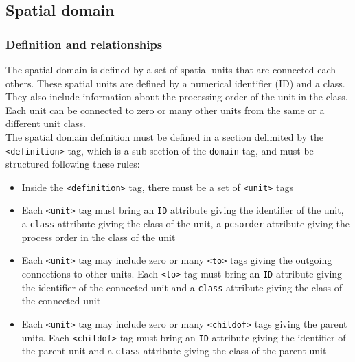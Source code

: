 


\bigskip

\subsection{Spatial domain}

\subsubsection{Definition and relationships}

The spatial domain is defined by a set of spatial units that are connected each others.
These spatial units are defined by a numerical identifier (ID) and a class.
They also include information about the processing order of the unit in the class.
Each unit can be connected to zero or many other units from the same or a different unit class.\\
\noindent The spatial domain definition must be defined in a section delimited
by the \texttt{<definition>} tag, which is a sub-section of the \texttt{domain}
tag, and must be structured following these rules:
\begin{itemize}
  \item Inside the \texttt{<definition>} tag, there must be a set of
  \texttt{<unit>} tags
  \item Each \texttt{<unit>} tag must bring an \texttt{ID} attribute giving
  the identifier of the unit, a \texttt{class} attribute giving the class of
  the unit, a \texttt{pcsorder} attribute giving the process order in the
  class of the unit
  \item Each \texttt{<unit>} tag may include zero or many \texttt{<to>} tags giving
  the outgoing connections to other units. Each \texttt{<to>} tag must bring an
  \texttt{ID} attribute giving the identifier of the connected unit and a
  \texttt{class} attribute giving the class of the connected unit
  \item Each \texttt{<unit>} tag may include zero or many \texttt{<childof>}
  tags giving the parent units. Each \texttt{<childof>} tag must bring an
  \texttt{ID} attribute giving the identifier of the parent unit and a
  \texttt{class} attribute giving the class of the parent unit   
\end{itemize}

